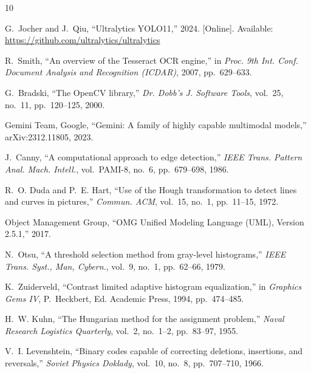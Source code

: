 \documentclass[journal,10pt]{IEEEtran}
\begin{document}
\begin{thebibliography}{10}

G.~Jocher and J.~Qiu, ``Ultralytics YOLO11,'' 2024. [Online]. Available:
\url{https://github.com/ultralytics/ultralytics}

R.~Smith, ``An overview of the Tesseract OCR engine,'' in \emph{Proc. 9th Int. Conf.
Document Analysis and Recognition (ICDAR)}, 2007, pp.~629--633.

G.~Bradski, ``The OpenCV library,'' \emph{Dr. Dobb's J. Software Tools}, vol.~25, no.~11,
pp.~120--125, 2000.

Gemini Team, Google, ``Gemini: A family of highly capable multimodal models,''
arXiv:2312.11805, 2023.

J.~Canny, ``A computational approach to edge detection,'' \emph{IEEE Trans. Pattern Anal.
Mach. Intell.}, vol.~PAMI-8, no.~6, pp.~679--698, 1986.

R.~O. Duda and P.~E. Hart, ``Use of the Hough transformation to detect lines and curves in
pictures,'' \emph{Commun. ACM}, vol.~15, no.~1, pp.~11--15, 1972.

Object Management Group, ``OMG Unified Modeling Language (UML), Version 2.5.1,'' 2017.

N.~Otsu, ``A threshold selection method from gray-level histograms,''
\emph{IEEE Trans. Syst., Man, Cybern.}, vol.~9, no.~1, pp.~62--66, 1979.

K.~Zuiderveld, ``Contrast limited adaptive histogram equalization,'' in \emph{Graphics
Gems IV}, P.~Heckbert, Ed. Academic Press, 1994, pp.~474--485.

H.~W. Kuhn, ``The Hungarian method for the assignment problem,'' \emph{Naval Research
Logistics Quarterly}, vol.~2, no.~1--2, pp.~83--97, 1955.

V.~I. Levenshtein, ``Binary codes capable of correcting deletions, insertions, and
reversals,'' \emph{Soviet Physics Doklady}, vol.~10, no.~8, pp.~707--710, 1966.

\end{thebibliography}
\end{document}
